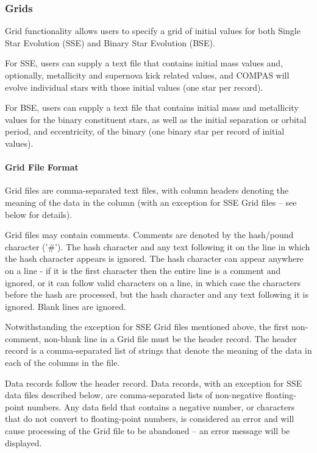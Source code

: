\subsubsection{Grids}\label{sec:Grids}

Grid functionality allows users to specify a grid of initial values for both Single Star Evolution (SSE) and Binary Star Evolution (BSE).

For SSE, users can supply a text file that contains initial mass values and, optionally, metallicity and supernova kick related values, and COMPAS will evolve individual stars with those initial values (one star per record).

For BSE, users can supply a text file that contains initial mass and metallicity values for the binary constituent stars, as well as the initial separation or orbital period, and eccentricity, of the binary (one binary star per record of initial values).

\paragraph{Grid File Format}\label{sec:GridFileFormat}\mbox{}

Grid files are comma-separated text files, with column headers denoting the meaning of the data in the column (with an exception for SSE Grid files -- see below for details).

Grid files may contain comments. Comments are denoted by the hash/pound character ('\#'). The hash character and any text following it on the line in which the hash character appears is ignored. The hash character can appear anywhere on a line - if it is the first character then the entire line is a comment and ignored, or it can follow valid characters on a line, in which case the characters before the hash are processed, but the hash character and any text following it is ignored. Blank lines are ignored.

Notwithstanding the exception for SSE Grid files mentioned above, the first non-comment, non-blank line in a Grid file must be the header record. The header record is a comma-separated list of strings that denote the meaning of the data in each of the columns in the file.

Data records follow the header record. Data records, with an exception for SSE data files described below, are comma-separated lists of non-negative floating-point numbers. Any data field that contains a negative number, or characters that do not convert to floating-point numbers, is considered an error and will cause processing of the Grid file to be abandoned -- an error message will be displayed.

